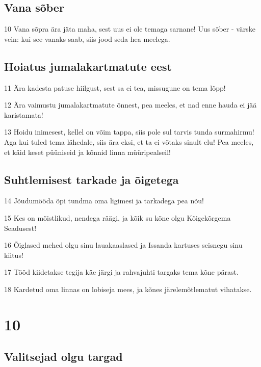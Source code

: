 \section*{Vana sõber}

\par 10 Vana sõpra ära jäta maha, sest uus ei ole temaga sarnane! Uus sõber - värske vein: kui see vanaks saab, siis jood seda hea meelega.

\section*{Hoiatus jumalakartmatute eest}

\par 11 Ära kadesta patuse hiilgust, sest sa ei tea, missugune on tema lõpp!
\par 12 Ära vaimustu jumalakartmatute õnnest, pea meeles, et nad enne hauda ei jää karistamata!
\par 13 Hoidu inimesest, kellel on võim tappa, siis pole sul tarvis tunda surmahirmu! Aga kui tuled tema lähedale, siis ära eksi, et ta ei võtaks sinult elu! Pea meeles, et käid keset püüniseid ja kõnnid linna müüripealseil!

\section*{Suhtlemisest tarkade ja õigetega}

\par 14 Jõudumööda õpi tundma oma ligimesi ja tarkadega pea nõu!
\par 15 Kes on mõistlikud, nendega räägi, ja kõik su kõne olgu Kõigekõrgema Seadusest!
\par 16 Õiglased mehed olgu sinu lauakaaslased ja Issanda kartuses seisnegu sinu kiitus!
\par 17 Tööd kiidetakse tegija käe järgi ja rahvajuhti targaks tema kõne pärast.
\par 18 Kardetud oma linnas on lobiseja mees, ja kõnes järelemõtlematut vihatakse.

\chapter{10}

\section*{Valitsejad olgu targad}

